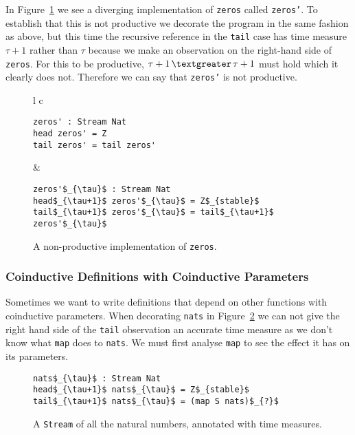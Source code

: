 In Figure~\ref{fig:zerosprime} we see a diverging implementation of \texttt{zeros} called \texttt{zeros'}. To establish that this is not productive we decorate the program in the same fashion as above, but this time the recursive reference in the \texttt{tail} case has time measure $\tau+1$ rather than $\tau$ because we make an observation on the right-hand side of \texttt{zeros}. For this to be productive, $\tau+1\,\textgreater\,\tau+1$ must hold which it clearly does not. Therefore we can say that \texttt{zeros'} is not productive.

\begin{figure}
\begin{tabular}{l c}

\begin{minipage}{3in}
\begin{Verbatim}[commandchars=\\\{\},codes={\catcode`$=3\catcode`_=8}]
zeros' : Stream Nat
head zeros' = Z
tail zeros' = tail zeros'
\end{Verbatim}
\end{minipage} &
\begin{minipage}{3in}
\begin{Verbatim}[commandchars=\\\{\},codes={\catcode`$=3\catcode`_=8}]
zeros'$_{\tau}$ : Stream Nat
head$_{\tau+1}$ zeros'$_{\tau}$ = Z$_{stable}$
tail$_{\tau+1}$ zeros'$_{\tau}$ = tail$_{\tau+1}$ zeros'$_{\tau}$
\end{Verbatim}
\end{minipage}

\end{tabular}
\caption{A non-productive implementation of \texttt{zeros}.}
\label{fig:zerosprime}
\end{figure}

\subsubsection{Coinductive Definitions with Coinductive Parameters}

Sometimes we want to write definitions that depend on other functions with coinductive parameters. When decorating \texttt{nats} in Figure~\ref{fig:nats_productivity} we can not give the right hand side of the \texttt{tail} observation an accurate time measure as we don't know what \texttt{map} does to \texttt{nats}. We must first analyse \texttt{map} to see the effect it has on its parameters.

\begin{figure}
\begin{Verbatim}[commandchars=\\\{\},codes={\catcode`$=3\catcode`_=8}]
nats$_{\tau}$ : Stream Nat
head$_{\tau+1}$ nats$_{\tau}$ = Z$_{stable}$
tail$_{\tau+1}$ nats$_{\tau}$ = (map S nats)$_{?}$
\end{Verbatim}
\caption{A \texttt{Stream} of all the natural numbers, annotated with time measures.}
\label{fig:nats_productivity}
\end{figure}

